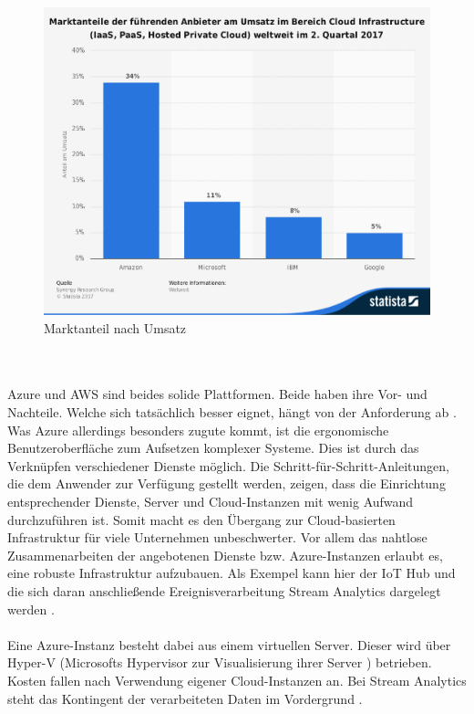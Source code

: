 \begin{figure}[ht!]
	\centering
	\includegraphics[width=1.0\linewidth]{images/statistik}
	\caption{Marktanteil nach Umsatz \cite{Statista.2017b}} %
	\label{fig:statistik}
\end{figure}
\\ \\ Azure und AWS sind beides solide Plattformen. Beide haben ihre Vor- und Nachteile. Welche sich tatsächlich besser eignet, hängt von der Anforderung ab \cite{PeterTsai.2016}. Was Azure allerdings besonders zugute kommt, ist die ergonomische Benutzeroberfläche zum Aufsetzen komplexer Systeme. Dies ist durch das Verknüpfen verschiedener Dienste möglich. Die Schritt-für-Schritt-Anleitungen, die dem Anwender zur Verfügung gestellt werden, zeigen, dass die Einrichtung entsprechender Dienste, Server und Cloud-Instanzen mit wenig Aufwand durchzuführen ist. Somit macht es den Übergang zur Cloud-basierten Infrastruktur für viele Unternehmen unbeschwerter. Vor allem das nahtlose Zusammenarbeiten der angebotenen Dienste bzw. Azure-Instanzen erlaubt es, eine robuste Infrastruktur aufzubauen. Als Exempel kann hier der IoT Hub und die sich daran anschließende Ereignisverarbeitung Stream Analytics dargelegt werden \cite{PeterTsai.2016}.\\ \\
Eine Azure-Instanz besteht dabei aus einem virtuellen Server. Dieser wird über Hyper-V (Microsofts Hypervisor zur Visualisierung ihrer Server \cite{searchdatacenter.2017}) betrieben. Kosten fallen nach Verwendung eigener Cloud-Instanzen an. Bei Stream Analytics steht das Kontingent der verarbeiteten Daten im Vordergrund \cite{PeterTsai.2016}.  
